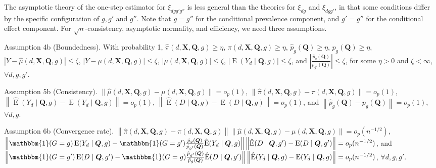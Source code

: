 \documentclass[12pt,a4paper]{article}
\newcommand{\E}{\operatorname{E}}
\def\X{{\boldsymbol X}}
\def\Q{{\boldsymbol Q}}
\def\one{\mathbbm{1}}
\begin{document}
The asymptotic theory of the one-step estimator for $\xi_{dgg'g''}$ is less general than the theories for $\xi_{dg}$ and $\xi_{dgg'}$, in that some conditions differ by the specific configuration of $g, g'$ and $g''$. Note that  $g=g''$ for the conditional prevalence component, and $g'=g''$ for the conditional effect component. For $\sqrt{n}$-consistency, asymptotic normality, and efficiency, we need three assumptions. 

Assumption 4b (Boundedness). With probability 1,  $\hat{\pi}(d,\X,\Q,g) \geq \eta$, $\pi(d,\X,\Q,g) \geq \eta$, $\hat{p}_g(\Q) \geq \eta$, $p_g(\Q) \geq \eta$, 
$|Y-\hat{\mu}(d,\X,\Q,g)| \leq \zeta$, 
$|Y-\mu(d,\X,\Q,g)| \leq \zeta$, 
$|\mu(d,\X,\Q,g)| \leq \zeta$,
$|\E(Y_d \mid \Q,g)| \leq \zeta$, and $\left| \frac{\hat{p}_g(\Q)}{\hat{p}_{g'}(\Q)} \right| \leq \zeta$, for some $\eta>0$ and $\zeta < \infty$, $\forall d,g,g'$.

Assumption 5b (Consistency). $\| \hat{\mu}(d,\X,\Q,g) - \mu(d,\X,\Q,g) \| =o_p(1)$, $\| \hat{\pi}(d,\X,\Q,g) - \pi(d,\X,\Q,g) \| =o_p(1)$, $\left\| \hat{\E}(Y_d \mid \Q,g) - \E(Y_d \mid \Q,g) \right\| =o_p(1)$, $\left\| \hat{\E}(D \mid \Q,g) - \E(D \mid \Q,g) \right\| =o_p(1)$, and $\left\| \hat{p}_g(\Q) -p_g(\Q) \right\|=o_p(1)$, $\forall d,g$.

Assumption 6b (Convergence rate). $\left\|\hat{\pi}(d,\X,\Q,g)-\pi(d,\X,\Q,g) \right\| \|\hat{\mu}(d,\X,\Q,g)-\mu(d,\X,\Q,g)\|=o_p(n^{-1/2})$, $\left\| \one(G=g) \E(Y_d \mid \Q,g) - \one(G=g')\frac{\hat{p}_{g}(\Q)}{\hat{p}_{g'}(\Q)} \hat{\E}( Y_d \mid \Q, g ) \right\| \left\| \hat{\E}(D \mid \Q, g') - \E(D \mid \Q, g') \right\| = o_p(n^{-1/2})$, and $\left\| \one(G=g') \E(D \mid \Q,g') - \one(G=g) \frac{\hat{p}_{g'}(\Q) }{\hat{p}_g(\Q) } \hat{\E}(D \mid \Q,g') \right\| \left\| \hat{\E}(Y_d \mid \Q,g) - \E(Y_d \mid \Q,g)  \right\| = o_p(n^{-1/2})$, $\forall d,g,g'$.
\end{document}
